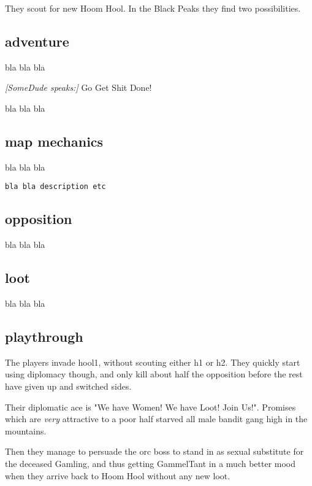 They scout for new Hoom Hool. In the Black Peaks they find two possibilities.


\subsection*{adventure}

bla bla bla

\begin{readoutloud}
\emph{[SomeDude speaks:]}
Go Get Shit Done!
\end{readoutloud}

\noindent bla bla bla

\subsection*{map mechanics}

bla bla bla

\small \begin{verbatim}
bla bla description etc
\end{verbatim} \normalsize


\subsection*{opposition}

bla bla bla


\subsection*{loot}

bla bla bla


\subsection*{playthrough}

The players invade hool1, without scouting either h1 or h2. They quickly start using diplomacy though, and only kill about half the opposition before the rest have given up and switched sides.

Their diplomatic ace is "We have Women! We have Loot! Join Us!". Promises which are \emph{very} attractive to a poor half starved all male bandit gang high in the mountains.

Then they manage to persuade the orc boss to stand in as sexual substitute for the deceased Gamling, and thus getting GammelTant in a much better mood when they arrive back to Hoom Hool without any new loot.

